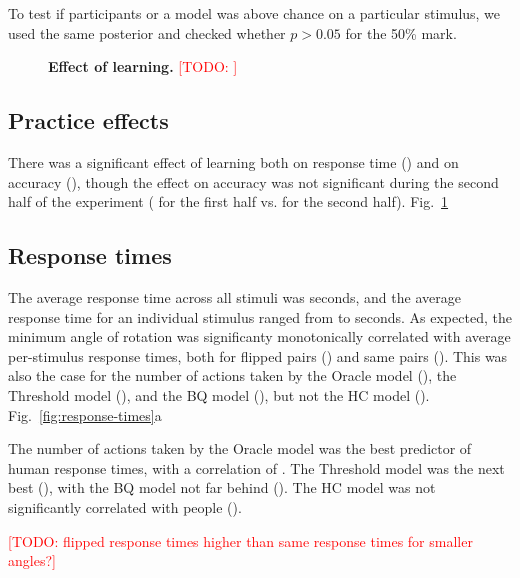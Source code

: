 \documentclass[10pt,letterpaper]{article}
\newcommand{\TODO}[1]{\textcolor{red}{[TODO: #1]}}
\newcommand{\Oc}[0]{Oracle}
\newcommand{\Th}[0]{Threshold}
\newcommand{\Hc}[0]{HC}
\newcommand{\Bq}[0]{BQ}
\begin{document}
To test if participants or a model was above chance on a particular
stimulus, we used the same posterior and checked whether $p>0.05$ for
the 50\% mark.

\begin{figure}[t]
  \centering
  \caption{\textbf{Effect of learning.} \TODO{}}
  \label{fig:learning}
\end{figure}

\subsection{Practice effects} 

There was a significant effect of learning both on response time
(\ExpTrialTimeCorr{}) and on accuracy (\ExpTrialAccuracyCorr{}),
though the effect on accuracy was not significant during the second
half of the experiment (\ExpaTrialAccuracyCorr{} for the first half
vs. \ExpbTrialAccuracyCorr{} for the second
half). Fig.~\ref{fig:learning}


\subsection{Response times}

The average response time across all stimuli was \ExpTime{} seconds,
and the average response time for an individual stimulus ranged from
\ExpTimeMin{} to \ExpTimeMax{} seconds.  As expected, the minimum
angle of rotation was significanty monotonically correlated with
average per-stimulus response times, both for flipped pairs
(\ExpThetaTimeCorrFlipped{}) and same pairs
(\ExpThetaTimeCorrSame{}). This was also the case for the number of
actions taken by the \Oc{} model (\OcThetaTimeCorr{}), the \Th{} model
(\ThThetaTimeCorr{}), and the \Bq{} model (\BqThetaTimeCorr{}), but
not the \Hc{} model
(\HcThetaTimeCorr{}). Fig.~\ref{fig:response-times}a

The number of actions taken by the \Oc{} model was the best predictor
of human response times, with a correlation of \ExpOcTimeCorr{}. The
\Th{} model was the next best (\ExpThTimeCorr{}), with the \Bq{} model
not far behind (\ExpBqTimeCorr{}). The \Hc{} model was not
significantly correlated with people (\ExpHcTimeCorr{}).

\TODO{flipped response times higher than same response times for
  smaller angles?}
\end{document}
